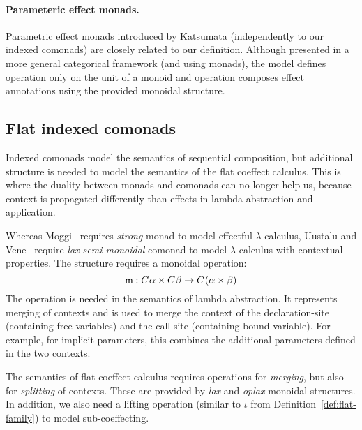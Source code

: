 \paragraph{Parameteric effect monads.}
Parametric effect monads introduced by Katsumata \cite{monads-parametric} (independently to our 
indexed comonads) are closely related to our definition.  Although presented in a more general 
categorical framework (and using monads), the model defines  operation only on the 
unit of a monoid and  operation composes effect annotations using the provided monoidal 
structure.



\subsection{Flat indexed comonads}
\label{sec:flat-semantics-monoidal}

Indexed comonads model the semantics of sequential composition, but additional structure is needed
to model the semantics of the flat coeffect calculus. This is where the duality between monads and 
comonads can no longer help us, because context is propagated differently than effects in lambda 
abstraction and application.

Whereas Moggi~\cite{monad-notions} requires \emph{strong} monad to model effectful $\lambda$-calculus, 
Uustalu and Vene~\cite{comonads-notions} require \emph{lax semi-monoidal} comonad to model 
$\lambda$-calculus with contextual properties. The structure requires a monoidal operation:
%
\begin{equation*}
\textnormal{\sffamily m} : C^{}\alpha \times C^{}\beta \rightarrow C^{}(\alpha \times \beta)
\end{equation*}
%
The  operation is needed in the semantics of lambda abstraction. It represents merging of 
contexts and is used to merge the context of the declaration-site (containing free variables)
and the call-site (containing bound variable). For example, for implicit parameters, this combines
the additional parameters defined in the two contexts.

The semantics of flat coeffect calculus requires operations for \emph{merging}, but also for
\emph{splitting} of contexts. These are provided by \emph{lax} and \emph{oplax} monoidal 
structures. In addition, we also need a lifting operation (similar to $\iota$ from 
Definition~\ref{def:flat-family}) to model sub-coeffecting.


